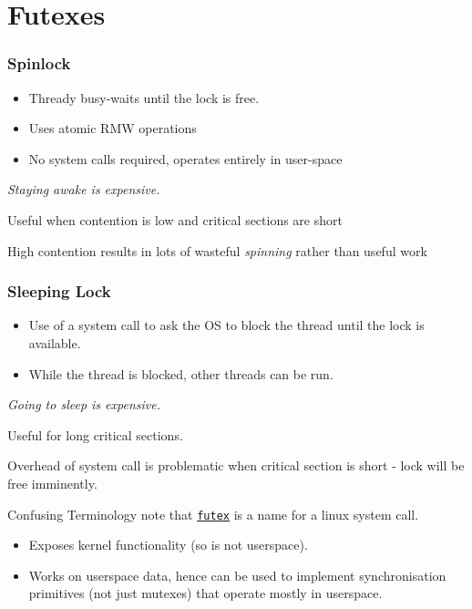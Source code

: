 \section{Futexes}
\begin{minipage}{.49\textwidth}
  \subsubsection{Spinlock}
  \begin{itemize}
    \item Thready busy-waits until the lock is free.
    \item Uses atomic RMW operations
    \item No system calls required, operates entirely in user-space
  \end{itemize}
  \textit{Staying awake is expensive.}
  \begin{prosbox}
    Useful when contention is low and critical sections are short
  \end{prosbox}
  \begin{consbox}
    High contention results in lots of wasteful \textit{spinning} rather than useful work
  \end{consbox}
\end{minipage}
\hfill
\begin{minipage}{.49\textwidth}
  \subsubsection{Sleeping Lock}
  \begin{itemize}
    \item Use of a system call to ask the OS to block the thread until the lock is available.
    \item While the thread is blocked, other threads can be run.
  \end{itemize}
  \textit{Going to sleep is expensive.}
  \begin{prosbox}
    Useful for long critical sections.
  \end{prosbox}
  \begin{consbox}
    Overhead of system call is problematic when critical section is short - lock will be free imminently.
  \end{consbox}
\end{minipage}
\begin{sidenotebox}{Confusing Terminology}
  note that \href{https://man7.org/linux/man-pages/man2/futex.2.html}{\texttt{futex}} is a name for a linux system call.
  \begin{itemize}
    \item Exposes kernel functionality (so is not userspace).
    \item Works on userspace data, hence can be used to implement synchronisation primitives (not just mutexes) that operate mostly in userspace.
  \end{itemize}
\end{sidenotebox}

